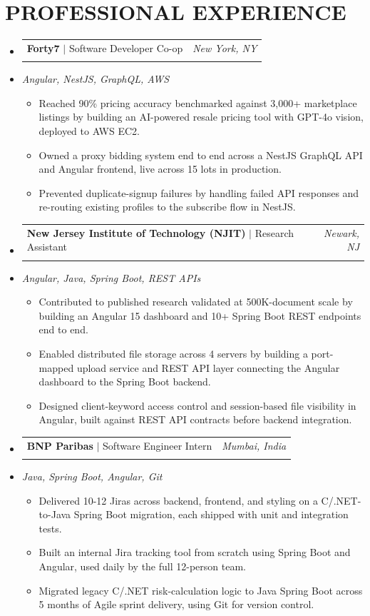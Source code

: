 \documentclass[letterpaper,11pt]{article}
\makeatletter
\newcommand{\resumeItem}[1]{
  \item\small{#1\vspace{-3pt}}
}
\newcommand{\resumeStack}[1]{
  \vspace{1pt}\item\small{\textit{#1}}\vspace{-6pt}
}
\newcommand{\resumeExpHeading}[4]{
  \vspace{-3pt}\item
    \begin{tabular*}{1.0\textwidth}[t]{l@{\extracolsep{\fill}}r}
      \textbf{\large #1} $|$ #2 & \textit{\large #3} \\
       & \text{\small #4} \\
    \end{tabular*}\vspace{-9pt}
}
\newcommand{\resumeItemListStart}{\begin{itemize}[leftmargin=0.15in, label=$\bullet$]}
\newcommand{\resumeItemListEnd}{\end{itemize}\vspace{-7pt}}
\newcommand{\resumeSubHeadingListStart}{\begin{itemize}[leftmargin=0.0in, label={}]}
\newcommand{\resumeSubHeadingListEnd}{\end{itemize}}
\makeatother
\begin{document}
\section{PROFESSIONAL EXPERIENCE}
\resumeSubHeadingListStart
\vspace{10pt}
\resumeExpHeading
{Forty7}{Software Developer Co-op}{New York, NY}{Jan 2026 -- May 2026}
\vspace{-13pt}
\resumeStack{Angular, NestJS, GraphQL, AWS}
\resumeItemListStart
  \resumeItem{Reached 90\% pricing accuracy benchmarked against 3,000+ marketplace listings by building an AI-powered resale pricing tool with GPT-4o vision, deployed to AWS EC2.}
  \resumeItem{Owned a proxy bidding system end to end across a NestJS GraphQL API and Angular frontend, live across 15 lots in production.}
  \resumeItem{Prevented duplicate-signup failures by handling failed API responses and re-routing existing profiles to the subscribe flow in NestJS.}
\resumeItemListEnd
\vspace{10pt}
\resumeExpHeading
{New Jersey Institute of Technology (NJIT)}{Research Assistant}{Newark, NJ}{Apr 2025 -- Sep 2025}
\vspace{-13pt}
\resumeStack{Angular, Java, Spring Boot, REST APIs}
\resumeItemListStart
  \resumeItem{Contributed to published research validated at 500K-document scale by building an Angular 15 dashboard and 10+ Spring Boot REST endpoints end to end.}
  \resumeItem{Enabled distributed file storage across 4 servers by building a port-mapped upload service and REST API layer connecting the Angular dashboard to the Spring Boot backend.}
  \resumeItem{Designed client-keyword access control and session-based file visibility in Angular, built against REST API contracts before backend integration.}
\resumeItemListEnd
\vspace{10pt}
\resumeExpHeading
{BNP Paribas}{Software Engineer Intern}{Mumbai, India}{Jan 2024 -- Jul 2024}
\vspace{-13pt}
\resumeStack{Java, Spring Boot, Angular, Git}
\resumeItemListStart
  \resumeItem{Delivered 10-12 Jiras across backend, frontend, and styling on a C/.NET-to-Java Spring Boot migration, each shipped with unit and integration tests.}
  \resumeItem{Built an internal Jira tracking tool from scratch using Spring Boot and Angular, used daily by the full 12-person team.}
  \resumeItem{Migrated legacy C/.NET risk-calculation logic to Java Spring Boot across 5 months of Agile sprint delivery, using Git for version control.}
\resumeItemListEnd

\resumeSubHeadingListEnd
\end{document}
